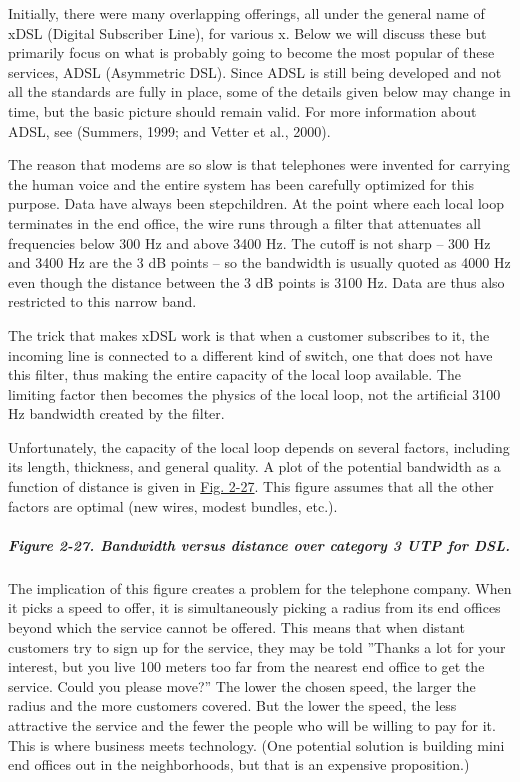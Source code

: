 \documentclass[b5paper,11pt]{memoir}
\begin{document}
Initially, there were many overlapping offerings, all under the general
name of {xDSL} ({Digital Subscriber Line}), for various {x}. Below we
will discuss these but primarily focus on what is probably going to
become the most popular of these services, {ADSL} ({Asymmetric DSL}).
Since ADSL is still being developed and not all the standards are fully
in place, some of the details given below may change in time, but the
basic picture should remain valid. For more information about ADSL, see
(Summers, 1999; and Vetter et al., 2000).

The reason that modems are so slow is that telephones were invented for
carrying the human voice and the entire system has been carefully
optimized for this purpose. Data have always been stepchildren. At the
point where each local loop terminates in the end office, the wire runs
through a filter that attenuates all frequencies below 300 Hz and above
3400 Hz. The cutoff is not sharp -- 300 Hz and 3400 Hz are the 3 dB
points -- so the bandwidth is usually quoted as 4000 Hz even though the
distance between the 3 dB points is 3100 Hz. Data are thus also
restricted to this narrow band.

The trick that makes xDSL work is that when a customer subscribes to it,
the incoming line is connected to a different kind of switch, one that
does not have this filter, thus making the entire capacity of the local
loop available. The limiting factor then becomes the physics of the
local loop, not the artificial 3100 Hz bandwidth created by the filter.

Unfortunately, the capacity of the local loop depends on several
factors, including its length, thickness, and general quality. A plot of
the potential bandwidth as a function of distance is given in
\protect\hyperlink{0130661023_ch02lev1sec5.htmlux5cux23ch02fig27}{Fig.
2-27}. This figure assumes that all the other factors are optimal (new
wires, modest bundles, etc.).

\subparagraph[Figure 2-27. Bandwidth versus distance over category 3 UTP
for
DSL.]{\texorpdfstring{\protect\hypertarget{0130661023_ch02lev1sec5.htmlux5cux23ch02fig27}{}{}Figure
2-27. Bandwidth versus distance over category 3 UTP for
DSL.}{Figure 2-27. Bandwidth versus distance over category 3 UTP for DSL.}}


The implication of this figure creates a problem for the telephone
company. When it picks a speed to offer, it is simultaneously picking a
radius from its end offices beyond which the service cannot be offered.
This means that when distant customers try to sign up for the service,
they may be told ''Thanks a lot for your interest, but you live 100
meters too far from the nearest end office to get the service. Could you
please move?'' The lower the chosen speed, the larger the radius and the
more customers covered. But the lower the speed, the less attractive the
service and the fewer the people who will be willing to pay for it. This
is where business meets technology. (One potential solution is building
mini end offices out in the neighborhoods, but that is an expensive
proposition.)
\end{document}
